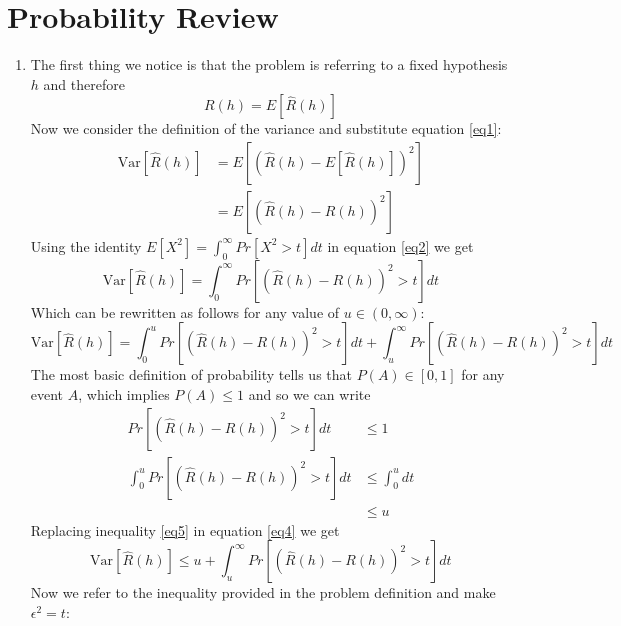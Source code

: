 \documentclass{article}
\begin{document}
\section{Probability Review}
    \begin{enumerate}[1.]
        \item The first thing we notice is that the problem is referring to a fixed hypothesis $h$ and therefore
        \begin{equation} \label{eq1}
            R(h) = E[\hat{R}(h)]
        \end{equation}
        Now we consider the definition of the variance and substitute equation \ref{eq1}:
        \begin{align}
            \text{Var}[\hat{R}(h)] &= E[(\hat{R}(h)-E[\hat{R}(h)])^2] \nonumber \\
                                   &= E[(\hat{R}(h)-R(h))^2] \label{eq2}
        \end{align}
        Using the identity $E[X^2]=\int_0^{\infty}Pr[X^2>t]dt$ in equation \ref{eq2} we get
        \begin{equation} \label{eq3}
            \text{Var}[\hat{R}(h)] = \int_0^{\infty}Pr[(\hat{R}(h)-R(h))^2>t]dt
        \end{equation}
        Which can be rewritten as follows for any value of $u \in (0, \infty)$:
        \begin{equation} \label{eq4}
            \text{Var}[\hat{R}(h)] = \int_0^uPr[(\hat{R}(h)-R(h))^2>t]dt + \int_u^{\infty}Pr[(\hat{R}(h)-R(h))^2>t]dt
        \end{equation}
        The most basic definition of probability tells us that $P(A) \in [0,1]$ for any event $A$, which implies $P(A) \leq 1$ and so we can write
        \begin{align}
            Pr[(\hat{R}(h)-R(h))^2>t]dt &\leq 1 \nonumber \\
            \int_0^uPr[(\hat{R}(h)-R(h))^2>t]dt &\leq \int_0^udt \nonumber \\
                                                &\leq u \label{eq5}
        \end{align}
        Replacing inequality \ref{eq5} in equation \ref{eq4} we get
        \begin{equation} \label{eq6}
            \text{Var}[\hat{R}(h)] \leq u + \int_u^{\infty}Pr[(\hat{R}(h)-R(h))^2>t]dt
        \end{equation}
        Now we refer to the inequality provided in the problem definition and make $\epsilon^2 = t$:
        \begin{align}

\end{align}
\end{enumerate}
\end{document}
